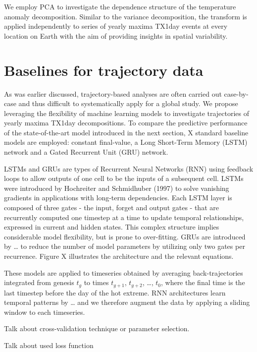 \documentclass[11pt,a4paper,twoside,openright]{report}
\theoremstyle{definition}
\numberwithin{equation}{subsection}
\begin{document}
We employ PCA to investigate the dependence structure of the temperature anomaly decomposition. Similar to the variance decomposition, the transform is applied independently to series of yearly maxima TX1day events at every location on Earth with the aim of providing insights in spatial variability.

\hypertarget{baselines-for-trajectory-data}{%
\section{Baselines for trajectory data}\label{baselines-for-trajectory-data}}

As was earlier discussed, trajectory-based analyses are often carried out case-by-case and thus difficult to systematically apply for a global study. We propose leveraging the flexibility of machine learning models to investigate trajectories of yearly maxima TX1day decompositions. To compare the predictive performance of the state-of-the-art model introduced in the next section, X standard baseline models are employed: constant final-value, a Long Short-Term Memory (LSTM) network and a Gated Recurrent Unit (GRU) network.

LSTMs and GRUs are types of Recurrent Neural Networks (RNN) using feedback loops to allow outputs of one cell to be the inputs of a subsequent cell. LSTMs were introduced by Hochreiter and Schmidhuber (1997) to solve vanishing gradients in applications with long-term dependencies. Each LSTM layer is composed of three gates - the input, forget and output gates - that are recurrently computed one timestep at a time to update temporal relationships, expressed in current and hidden states. This complex structure implies considerable model flexibility, but is prone to over-fitting. GRUs are introduced by \ldots{} to reduce the number of model parameters by utilizing only two gates per recurrence. Figure X illustrates the architecture and the relevant equations.

These models are applied to timeseries obtained by averaging back-trajectories integrated from genesis \(t_g\) to times \(t_{g+1}\), \(t_{g+2}\), \ldots, \(t_{0}\), where the final time is the last timestep before the day of the hot extreme. RNN architectures learn temporal patterns by \ldots{} and we therefore augment the data by applying a sliding window to each timeseries.

Talk about cross-validation technique or parameter selection.

Talk about used loss function
\end{document}
